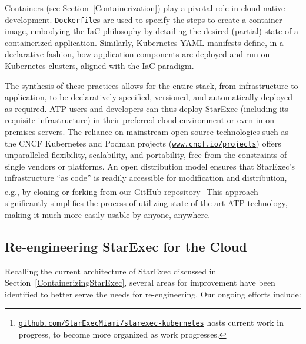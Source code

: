 \documentclass{easychair}
\begin{document}
Containers (see Section~\ref{Containerization}) play a pivotal role in cloud-native development. 
{\tt Dockerfile}s are used to specify the steps to create a container image, embodying the IaC 
philosophy by detailing the desired (partial) state of a containerized application. 
Similarly, Kubernetes YAML manifests define, in a declarative fashion, how application components 
are deployed and run on Kubernetes clusters, aligned with the IaC paradigm.

The synthesis of these practices allows for the entire stack, from infrastructure to application, 
to be declaratively specified, versioned, and automatically deployed as required. 
ATP users and developers can thus deploy StarExec (including its requisite infrastructure) in 
their preferred cloud environment or even in on-premises servers. 
The reliance on mainstream open source technologies such as the CNCF Kubernetes and Podman
projects (\href{https://www.cncf.io/projects/}{\tt www.cncf.io/projects}) offers unparalleled 
flexibility, scalability, and portability, free from the constraints of single vendors or 
platforms.
An open distribution model ensures that StarExec's infrastructure ``as code'' is readily 
accessible for modification and distribution, e.g., by cloning or forking from our GitHub 
repository\footnote{%
\href{https://github.com/StarExecMiami/starexec-kubernetes}{\tt github.com/StarExecMiami/starexec-kubernetes} 
hosts current work in progress, to become more organized as work progresses.}
This approach significantly simplifies the process of utilizing state-of-the-art ATP technology, 
making it much more easily usable by anyone, anywhere.

\subsection{Re-engineering StarExec for the Cloud}
\label{FutureStarExec}

Recalling the current architecture of StarExec discussed in Section~\ref{ContainerizingStarExec}, 
several areas for improvement have been identified to better serve the needs for re-engineering. 
Our ongoing efforts include:
\end{document}
